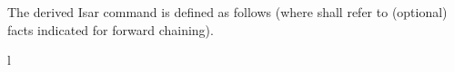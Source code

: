 \begin{isabellebody}
\begin{isamarkuptext}
  The derived Isar command \hyperlink{command.obtain}{\mbox{}} is defined as follows
  (where  shall refer to (optional)
  facts indicated for forward chaining).
  \begin{matharray}{l}
    ~~\hyperlink{command.obtain}{\mbox{}}~ \\[1ex]
    \quad \hyperlink{command.have}{\mbox{}}~ \\
    \quad \hyperlink{command.proof}{\mbox{}}~ \\
    \qquad \hyperlink{command.fix}{\mbox{}}~ \\
    \qquad \hyperlink{command.assume}{\mbox{}}~ \\
    \qquad \hyperlink{command.then}{\mbox{}}~\hyperlink{command.show}{\mbox{}}~ \\
    \quad\qquad \hyperlink{command.apply}{\mbox{}}~\isa{{\isacharminus}} \\
    \quad\qquad \hyperlink{command.using}{\mbox{}}~ \\

\end{matharray}
\end{isamarkuptext}
\end{isabellebody}

